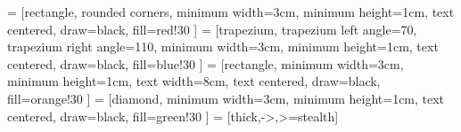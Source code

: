 
\newcommand{\note}   [2][]{\todo[color=green!25,bordercolor=green,tickmarkheight=3pt,#1]{#2}}
\newcommand{\unsure} [2][]{\todo[color=Plum!25,bordercolor=Plum,tickmarkheight=3pt,#1]{#2}}
\newcommand{\change} [2][]{\todo[color=blue!25,bordercolor=blue,tickmarkheight=3pt,#1]{#2}}
\newcommand{\missing}[2][]{\todo[color=red!25,bordercolor=red,tickmarkheight=3pt,#1]{#2}}
\newcommand{\info}   [2][]{\todo[nolist,color=yellow!25,bordercolor=yellow,tickmarkheight=3pt,#1]{#2}}

\newcommand{\imgref} [1]{\hyperref[#1]{Abb.~\getrefnumber{#1}}}
\newcommand{\tabref} [1]{\hyperref[#1]{Tab.~\getrefnumber{#1}}}
\newcommand{\coderef}[1]{\hyperref[#1]{Code~\getrefnumber{#1}}}
\newcommand{\mathref}[1]{\hyperref[#1]{Gl.~\getrefnumber{#1}}}

\newcommand{\Imgref} [1]{\hyperref[#1]{Figure~\getrefnumber{#1}}}
\newcommand{\Tabref} [1]{\hyperref[#1]{Table~\getrefnumber{#1}}}
\newcommand{\Coderef}[1]{\hyperref[#1]{Code~\getrefnumber{#1}}}
\newcommand{\Mathref}[1]{\hyperref[#1]{Equation~\getrefnumber{#1}}}
\newcommand{\secref} [1]{\autoref{#1}}

\usetikzlibrary{shapes.geometric, arrows}
 = [rectangle,
                         rounded corners,
                         minimum width=3cm,
                         minimum height=1cm,
                         text centered,
                         draw=black,
                         fill=red!30
                        ]
 = [trapezium,
                  trapezium left angle=70,
                  trapezium right angle=110,
                  minimum width=3cm,
                  minimum height=1cm,
                  text centered,
                  draw=black,
                  fill=blue!30
                ]
 = [rectangle,
                       minimum width=3cm,
                       minimum height=1cm,
                       text width=8cm,
                       text centered,
                       draw=black,
                       fill=orange!30
                      ]
 = [diamond,
                        minimum width=3cm,
                        minimum height=1cm,
                        text centered,
                        draw=black,
                        fill=green!30
                      ]
 = [thick,->,>=stealth]                